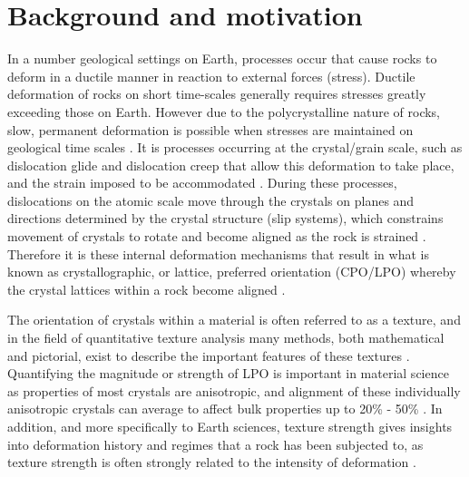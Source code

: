 \documentclass[a4paper,12pt,twoside]{report}
\numberwithin{equation}{chapter}
\begin{document}
\section{Background and motivation} \label{sec:background}
In a number geological settings on Earth, processes occur that cause rocks to deform in a ductile manner in reaction to external forces (stress). Ductile deformation of rocks on short time-scales generally requires stresses greatly exceeding those on Earth. However due to the polycrystalline nature of rocks, slow, permanent deformation is possible when stresses are maintained on geological time scales \citep{Weiss1985}. It is processes occurring at the crystal/grain scale, such as dislocation glide and dislocation creep that allow this deformation to take place, and the strain imposed to be accommodated \citep{Ashby1972}. During these processes, dislocations on the atomic scale move through the crystals on planes and directions determined by the crystal structure (slip systems), which constrains movement of crystals to rotate and become aligned as the rock is strained \citep{Goulding2015}. Therefore it is these internal deformation mechanisms that result in what is known as crystallographic, or lattice, preferred orientation (CPO/LPO) whereby the crystal lattices within a rock become aligned \citep{Price1985}.   

The orientation of crystals within a material is often referred to as a texture, and in the field of quantitative texture analysis many methods, both mathematical and pictorial, exist to describe the important features of these textures \citep[for introductory texts see][]{bunge1982texture,Bunge1985,Randle2000,Mainprice}. Quantifying the magnitude or strength of LPO is important in material science as properties of most crystals are anisotropic, and alignment of these individually anisotropic crystals can average to affect bulk properties up to 20\% - 50\% \citep{Randle2000}. In addition, and more specifically to Earth sciences, texture strength gives insights into deformation history and regimes that a rock has been subjected to, as texture strength is often strongly related to the intensity of deformation \citep{Weiss1985}.
\end{document}
